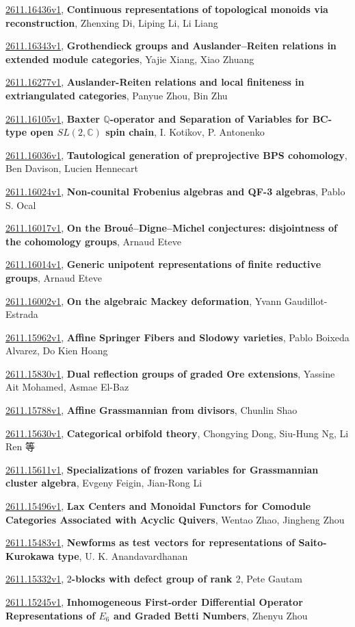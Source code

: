 \documentclass[9pt, a4paper]{article}
\theoremstyle{plain}
\theoremstyle{definition}
\theoremstyle{remark}
\newcommand{\arxiv}[3]{\href{https://arxiv.org/abs/#1}{#1}, \textbf{\textcolor{arxivblue}{#2}}, #3}
\begin{document}
\arxiv{2611.16436v1}{Continuous representations of topological monoids via reconstruction}{Zhenxing Di, Liping Li, Li Liang}

\arxiv{2611.16343v1}{Grothendieck groups and Auslander--Reiten relations in extended module categories}{Yajie Xiang, Xiao Zhuang}

\arxiv{2611.16277v1}{Auslander-Reiten relations and local finiteness in extriangulated categories}{Panyue Zhou, Bin Zhu}

\arxiv{2611.16105v1}{Baxter $\mathbb{Q}$-operator and Separation of Variables for BC-type open $SL(2,\mathbb{C})$ spin chain}{I. Kotikov, P. Antonenko}

\arxiv{2611.16036v1}{Tautological generation of preprojective BPS cohomology}{Ben Davison, Lucien Hennecart}

\arxiv{2611.16024v1}{Non-counital Frobenius algebras and QF-3 algebras}{Pablo S. Ocal}

\arxiv{2611.16017v1}{On the Broué--Digne--Michel conjectures: disjointness of the cohomology groups}{Arnaud Eteve}

\arxiv{2611.16014v1}{Generic unipotent representations of finite reductive groups}{Arnaud Eteve}

\arxiv{2611.16002v1}{On the algebraic Mackey deformation}{Yvann Gaudillot-Estrada}

\arxiv{2611.15962v1}{Affine Springer Fibers and Slodowy varieties}{Pablo Boixeda Alvarez, Do Kien Hoang}

\arxiv{2611.15830v1}{Dual reflection groups of graded Ore extensions}{Yassine Ait Mohamed, Asmae El-Baz}

\arxiv{2611.15788v1}{Affine Grassmannian from divisors}{Chunlin Shao}

\arxiv{2611.15630v1}{Categorical orbifold theory}{Chongying Dong, Siu-Hung Ng, Li Ren 等}

\arxiv{2611.15611v1}{Specializations of frozen variables for Grassmannian cluster algebra}{Evgeny Feigin, Jian-Rong Li}

\arxiv{2611.15496v1}{Lax Centers and Monoidal Functors for Comodule Categories Associated with Acyclic Quivers}{Wentao Zhao, Jingheng Zhou}

\arxiv{2611.15483v1}{Newforms as test vectors for representations of Saito-Kurokawa type}{U. K. Anandavardhanan}

\arxiv{2611.15332v1}{$2$-blocks with defect group of rank $2$}{Pete Gautam}

\arxiv{2611.15245v1}{Inhomogeneous First-order Differential Operator Representations of $E_6$ and Graded Betti Numbers}{Zhenyu Zhou}
\end{document}
